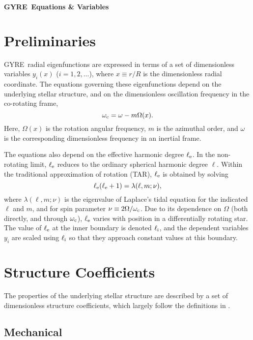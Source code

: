 \documentclass[fleqn]{article}
\newcommand{\gyre}{GYRE}
\newcommand{\omegac}{\omega_{\rm c}}
\newcommand{\elle}{\ell_{\rm e}}
\newcommand{\elli}{\ell_{\rm i}}
\begin{document}
\begin{center}
  {\LARGE \textbf{\gyre\ Equations \& Variables}}
\end{center}

\section*{Preliminaries}

\gyre\ radial eigenfunctions are expressed in terms of a set of
dimensionless variables $y_{i}(x)$ ($i=1,2,\ldots$), where $x\equiv
r/R$ is the dimensionless radial coordinate. The equations governing
these eigenfunctions depend on the underlying stellar structure, and
on the dimensionless oscillation frequency in the co-rotating frame,
\begin{equation*}
  \omegac = \omega - m \Omega(x).
\end{equation*}
Here, $\Omega(x)$ is the rotation angular frequency, $m$ is the
azimuthal order, and $\omega$ is the corresponding dimensionless
frequency in an inertial frame.

The equations also depend on the effective harmonic degree $\elle$. In
the non-rotating limit, $\elle$ reduces to the ordinary spherical
harmonic degree $\ell$. Within the traditional approximation of
rotation (TAR), $\elle$ is obtained by solving
\begin{equation*}
  \elle(\elle+1) = \lambda(\ell,m;\nu),
\end{equation*}
where $\lambda(\ell,m;\nu)$ is the eigenvalue of Laplace's tidal
equation \citep[see, e.g.,][]{Townsend:2003aa} for the indicated
$\ell$ and $m$, and for spin parameter $\nu \equiv 2
\Omega/\omegac$. Due to its dependence on $\Omega$ (both directly, and
through $\omegac$), $\elle$ varies with position in a differentially
rotating star. The value of $\elle$ at the inner boundary is denoted
$\elli$, and the dependent variables $y_{i}$ are scaled using $\elli$
so that they approach constant values at this boundary.

\section*{Structure Coefficients}

The properties of the underlying stellar structure are described by a
set of dimensionless structure coefficients, which largely follow the
definitions in \citet{Unno:1989aa}.

\subsection*{Mechanical}
\end{document}
